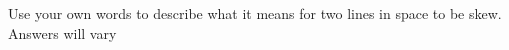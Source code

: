 {Use your own words to describe what it means for two lines in space to be skew.
}
{Answers will vary
}

